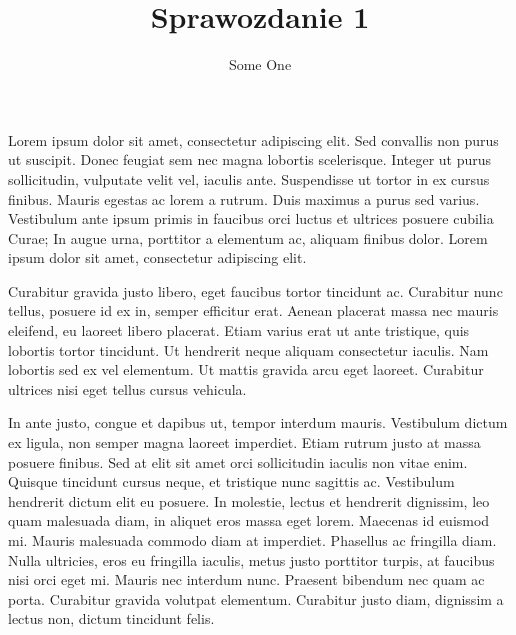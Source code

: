 \documentclass{article}
\title{Sprawozdanie 1}
\author{Some One}
\begin{document}
    \maketitle
    Lorem ipsum dolor sit amet, consectetur adipiscing elit. Sed convallis non purus ut suscipit. 
    Donec feugiat sem nec magna lobortis scelerisque. Integer ut purus sollicitudin, vulputate velit vel, 
    iaculis ante. Suspendisse ut tortor in ex cursus finibus. Mauris egestas ac lorem a rutrum. 
    Duis maximus a purus sed varius. Vestibulum ante ipsum primis in faucibus orci luctus et ultrices 
    posuere cubilia Curae; In augue urna, porttitor a elementum ac, aliquam finibus dolor. 
    Lorem ipsum dolor sit amet, consectetur adipiscing elit.

    Curabitur gravida justo libero, eget faucibus tortor tincidunt ac. Curabitur nunc tellus, 
    posuere id ex in, semper efficitur erat. Aenean placerat massa nec mauris eleifend, eu laoreet 
    libero placerat. Etiam varius erat ut ante tristique, quis lobortis tortor tincidunt. 
    Ut hendrerit neque aliquam consectetur iaculis. Nam lobortis sed ex vel elementum. Ut mattis gravida 
    arcu eget laoreet. Curabitur ultrices nisi eget tellus cursus vehicula.

    In ante justo, congue et dapibus ut, tempor interdum mauris. Vestibulum dictum ex ligula, 
    non semper magna laoreet imperdiet. Etiam rutrum justo at massa posuere finibus. Sed at elit 
    sit amet orci sollicitudin iaculis non vitae enim. Quisque tincidunt cursus neque, et tristique 
    nunc sagittis ac. Vestibulum hendrerit dictum elit eu posuere. In molestie, lectus et hendrerit dignissim, 
    leo quam malesuada diam, in aliquet eros massa eget lorem. Maecenas id euismod mi. Mauris malesuada commodo 
    diam at imperdiet. Phasellus ac fringilla diam. Nulla ultricies, eros eu fringilla iaculis, 
    metus justo porttitor turpis, at faucibus nisi orci eget mi. Mauris nec interdum nunc. 
    Praesent bibendum nec quam ac porta. Curabitur gravida volutpat elementum. Curabitur justo diam, 
    dignissim a lectus non, dictum tincidunt felis.

    
    \newpage


\end{document}
